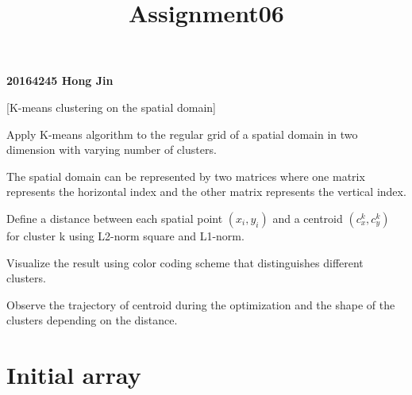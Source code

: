 \documentclass[11pt]{article}
\title{Assignment06}
\begin{document}
    
    
    \maketitle
    
    

    
    \textbf{20164245 Hong Jin}

    {[}K-means clustering on the spatial domain{]}

Apply K-means algorithm to the regular grid of a spatial domain in two
dimension with varying number of clusters.

The spatial domain can be represented by two matrices where one matrix
represents the horizontal index and the other matrix represents the
vertical index.

Define a distance between each spatial point \((x_i, y_i)\) and a
centroid \((c_x^k, c_y^k)\) for cluster k using L2-norm square and
L1-norm.

Visualize the result using color coding scheme that distinguishes
different clusters.

Observe the trajectory of centroid during the optimization and the shape
of the clusters depending on the distance.

    \section{Initial array}\label{initial-array}
\end{document}
